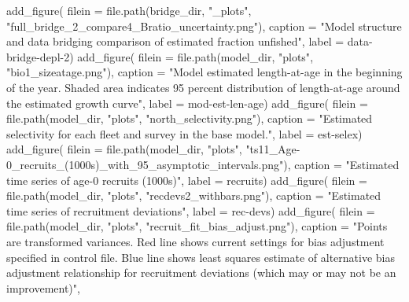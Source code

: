 \documentclass[
  letterpaper,
]{article}
\newenvironment{Shaded}{\begin{snugshade}}{\end{snugshade}}
\newcommand{\AttributeTok}[1]{\textcolor[rgb]{0.77,0.63,0.00}{#1}}
\newcommand{\FunctionTok}[1]{\textcolor[rgb]{0.00,0.00,0.00}{#1}}
\newcommand{\NormalTok}[1]{#1}
\newcommand{\StringTok}[1]{\textcolor[rgb]{0.31,0.60,0.02}{#1}}
\begin{document}
\begin{Shaded}
\begin{Highlighting}[]
\FunctionTok{add\_figure}\NormalTok{(}
\AttributeTok{filein =} \FunctionTok{file.path}\NormalTok{(bridge\_dir, }\StringTok{"\_plots"}\NormalTok{, }\StringTok{"full\_bridge\_2\_compare4\_Bratio\_uncertainty.png"}\NormalTok{),}
\AttributeTok{caption =} \StringTok{"Model structure and data bridging comparison of estimated fraction unfished"}\NormalTok{,}
\AttributeTok{label =} \StringTok{\textquotesingle{}data{-}bridge{-}depl{-}2\textquotesingle{}}\NormalTok{)}
\FunctionTok{add\_figure}\NormalTok{(}
\AttributeTok{filein =} \FunctionTok{file.path}\NormalTok{(model\_dir, }\StringTok{"plots"}\NormalTok{, }\StringTok{"bio1\_sizeatage.png"}\NormalTok{),}
\AttributeTok{caption =} \StringTok{"Model estimated length{-}at{-}age in the beginning of the year. Shaded area indicates 95 percent distribution of length{-}at{-}age around the estimated growth curve"}\NormalTok{,}
\AttributeTok{label =} \StringTok{\textquotesingle{}mod{-}est{-}len{-}age\textquotesingle{}}\NormalTok{)}
\FunctionTok{add\_figure}\NormalTok{(}
\AttributeTok{filein =} \FunctionTok{file.path}\NormalTok{(model\_dir, }\StringTok{"plots"}\NormalTok{, }\StringTok{"north\_selectivity.png"}\NormalTok{),}
\AttributeTok{caption =} \StringTok{"Estimated selectivity for each fleet and survey in the base model."}\NormalTok{,}
\AttributeTok{label =} \StringTok{\textquotesingle{}est{-}selex\textquotesingle{}}\NormalTok{)}
\FunctionTok{add\_figure}\NormalTok{(}
\AttributeTok{filein =} \FunctionTok{file.path}\NormalTok{(model\_dir, }\StringTok{"plots"}\NormalTok{, }\StringTok{"ts11\_Age{-}0\_recruits\_(1000s)\_with\_95\_asymptotic\_intervals.png"}\NormalTok{), }
\AttributeTok{caption =} \StringTok{"Estimated time series of age{-}0 recruits (1000s)"}\NormalTok{,}
\AttributeTok{label =} \StringTok{\textquotesingle{}recruits\textquotesingle{}}\NormalTok{)}
\FunctionTok{add\_figure}\NormalTok{(}
\AttributeTok{filein =} \FunctionTok{file.path}\NormalTok{(model\_dir, }\StringTok{"plots"}\NormalTok{, }\StringTok{"recdevs2\_withbars.png"}\NormalTok{), }
\AttributeTok{caption =} \StringTok{"Estimated time series of recruitment deviations"}\NormalTok{,}
\AttributeTok{label =} \StringTok{\textquotesingle{}rec{-}devs\textquotesingle{}}\NormalTok{)}
\FunctionTok{add\_figure}\NormalTok{(}
\AttributeTok{filein =} \FunctionTok{file.path}\NormalTok{(model\_dir, }\StringTok{"plots"}\NormalTok{, }\StringTok{"recruit\_fit\_bias\_adjust.png"}\NormalTok{), }
\AttributeTok{caption =} \StringTok{"Points are transformed variances. Red line shows current settings for bias adjustment specified in control file. Blue line shows least squares estimate of alternative bias adjustment relationship for recruitment deviations (which may or may not be an improvement)"}\NormalTok{,}

\end{Highlighting}
\end{Shaded}
\end{document}
